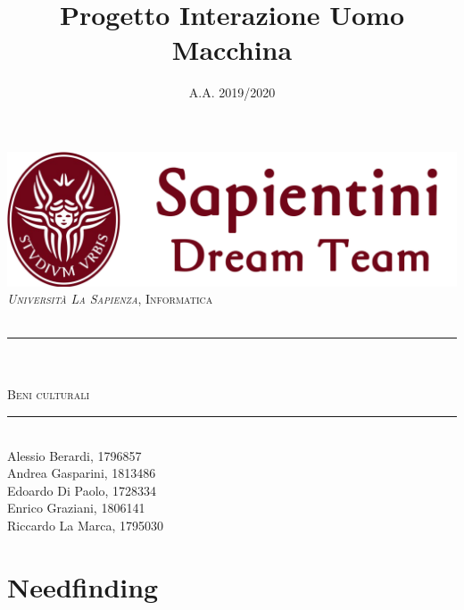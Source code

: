 \documentclass[11pt]{article}
\title{Progetto Interazione Uomo Macchina}
\date{A.A. 2019/2020}
\makeatletter
\def\projectName{Beni culturali}
\let\documentTitle\@title
\let\academicYear\@date
\makeatother
\begin{document}
\begin{titlepage}
	\centering
    \vspace*{0.5 cm}
    \includegraphics{images/logosapientini.png}\\[0.75 cm]
	\textsc{\textit{Università La Sapienza}, Informatica}\\[0.25 cm]
	\textsc{\academicYear}\\[0.5 cm]
	\rule{\linewidth}{0.2 mm} \\[0.4 cm]
	\textsc{\large \documentTitle}\\[0.4 cm]
	\textsc{\Huge \projectName}\\
	\rule{\linewidth}{0.2 mm} \\[1.5 cm]
	
	\large
	Alessio Berardi, 1796857\\[0.2 cm]
	Andrea Gasparini, 1813486\\[0.2 cm]
    Edoardo Di Paolo, 1728334\\[0.2 cm]
    Enrico Graziani, 1806141\\[0.2 cm]
    Riccardo La Marca, 1795030\\[0.2 cm]
\end{titlepage}

\tableofcontents
\pagebreak


\pagebreak


\pagebreak

\section{Needfinding}

\pagebreak

\pagebreak

\pagebreak


\pagebreak


\pagebreak


\end{document}
